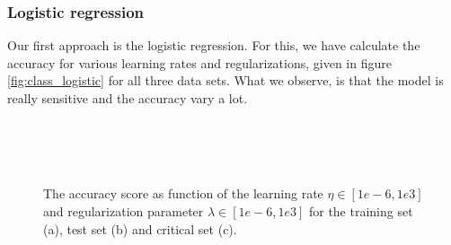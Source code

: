 \subsubsection{Logistic regression}
Our first approach is the logistic regression. For this, we have calculate the accuracy for various learning rates and regularizations, given in figure \eqref{fig:class_logistic} for all three data sets. What we observe, is that the model is really sensitive and the accuracy vary a lot. 
\begin{figure} [H]%
	\centering
	\\
	
	\\
	
	\\
	
	\caption{The accuracy score as function of the learning rate $\eta\in[1e-6,1e3]$ and regularization parameter $\lambda\in[1e-6,1e3]$ for the training set (a), test set (b) and critical set (c).}%
	\label{fig:class_logistic}
\end{figure}
